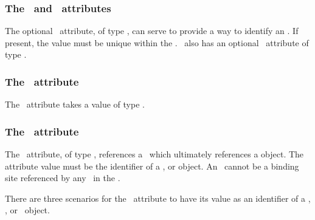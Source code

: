 \subsubsection{The \idAtt\ and \nameAtt\ attributes}
\label{def:OutwardBindingSite:idAndName}

The optional \idAtt\ attribute, of type \SIdPT, can serve to provide a way to identify an \outwardBindingSite. If present, the value must be unique within the \species. \OutwardBindingSite\ also has an optional \nameAtt\ attribute of type \stringPT.

\subsubsection{The \bindingStatusAtt\ attribute}
\label{def:OutwardBindingSite:bindingStatus}

The \bindingStatusAtt\ attribute takes a value of type \BindingStatusPTWC.

\subsubsection{The \componentAtt\ attribute}
\label{def:OutwardBindingSite:component}

The \componentAtt\ attribute, of type \SIdRefPT, references a \component\ which ultimately \mBlockChangedBegin{\revTwentyTwentyMarch}references\mBlockChangedEnd{\revTwentyTwentyMarch} a \BindingSiteSpeciesType object. The attribute value must be the identifier of a \SpeciesTypeInstance, \SpeciesTypeComponentIndex or \SpeciesType object. An \outwardBindingSite\ cannot be a binding site referenced by any \inSpeciesTypeBond\ in the \species.

There are three scenarios for the \componentAtt\ attribute to have \mBlockChangedBegin{\revTwentyTwentyMarch}its value as\mBlockChangedEnd{\revTwentyTwentyMarch} an identifier of \mBlockChangedBegin{\revTwentyTwentyMarch}a \SpeciesType, \SpeciesTypeInstance, or \SpeciesTypeComponentIndex\ object\mBlockChangedEnd{\revTwentyTwentyMarch}.


